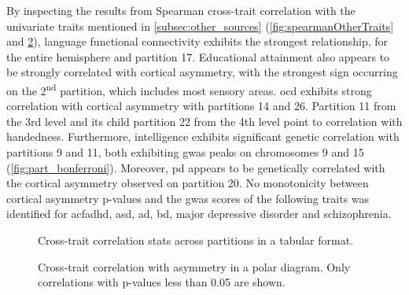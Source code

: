 By inspecting the results from Spearman cross-trait correlation with the univariate traits mentioned in \autoref{subsec:other_sources} (\autoref{fig:spearmanOtherTraits} and \ref{fig:cross_trait_polar}), language functional connectivity exhibits the strongest relationship, for the entire hemisphere and partition 17.  Educational attainment also appears to be strongly correlated with cortical asymmetry, with the strongest sign occurring on the 2\textsuperscript{nd} partition, which includes most sensory areas. \Ac{ocd} exhibits strong correlation with cortical asymmetry with partitions 14 and 26. Partition 11 from the 3rd level and its child partition 22 from the 4th level point to correlation with handedness. Furthermore, intelligence exhibits significant genetic correlation with partitions 9 and 11, both exhibiting \ac{gwas} peaks on chromosomes 9 and 15 (\autoref{fig:part_bonferroni}). Moreover, \ac{pd} appears to be genetically correlated with the cortical asymmetry observed on partition 20. No monotonicity between cortical asymmetry p-values and the \ac{gwas} scores of the following traits was identified for 
acf{adhd}, \acf{asd}, \acf{ad}, \acf{bd}, major depressive disorder and schizophrenia.

\begin{figure}[H]
	\caption{Cross-trait correlation stats across partitions in a tabular format.}
	\label{fig:spearmanOtherTraits}
\end{figure}

\begin{figure}[H]
	\begin{adjustwidth}{-4cm}{-3.5cm}
		\centering
		\subfloat{
			
		}
		\par\medskip
		\raggedleft
		\subfloat{
			
		}
	
\end{adjustwidth}	
	\caption[Cross-trait correlation with cortical asymmetry in a polar diagram]{Cross-trait correlation with asymmetry in a polar diagram. Only correlations with p-values less than 0.05 are shown.}
	\label{fig:cross_trait_polar}
\end{figure}

